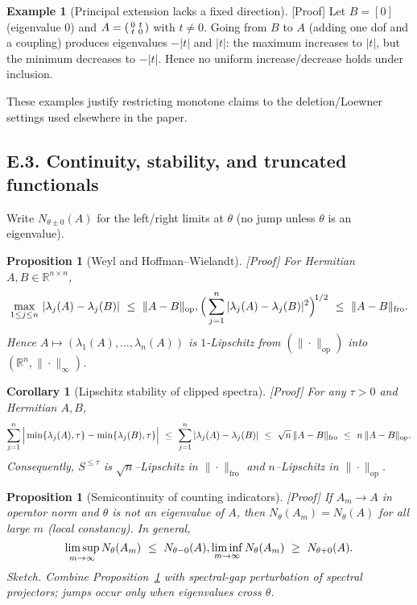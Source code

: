 \documentclass[11pt]{article}
\numberwithin{equation}{section}
\newtheorem{proposition}[theorem]{Proposition}
\newtheorem{corollary}[theorem]{Corollary}
\theoremstyle{definition}
\newtheorem{example}[theorem]{Example}
\providecommand{\n}{\unskip\space}
\begin{document}
\begin{example}[Principal extension lacks a fixed direction]\label{E:ex:principal-extend}
\textup{[Proof]}
Let \(B=[0]\) (eigenvalue \(0\)) and
\(A=\begin{psmallmatrix}0 & t\\ t & 0\end{psmallmatrix}\) with \(t\neq 0\).
Going from \(B\) to \(A\) (adding one dof and a coupling) produces eigenvalues \(-|t|\) and \(|t|\):
the maximum increases to \(|t|\), but the minimum decreases to \(-|t|\).
Hence no uniform increase/decrease holds under inclusion.
\end{example}

These examples justify restricting monotone claims to the deletion/Loewner settings used elsewhere in the paper.

\subsection*{E.3. Continuity, stability, and truncated functionals}

Write \(N_{\theta\pm 0}(A)\) for the left/right limits at \(\theta\) (no jump unless \(\theta\) is an eigenvalue).

\begin{proposition}[Weyl and Hoffman–Wielandt]\label{E:prop:weyl}
\textup{[Proof]}
For Hermitian \(A,B\in\mathbb{R}^{n\times n}\),
\[
\max_{1\le j\le n}\,|\lambda_j(A)-\lambda_j(B)|\ \le\ \|A-B\|_{\mathrm{op}},\qquad\n\Big(\sum_{j=1}^n |\lambda_j(A)-\lambda_j(B)|^2\Big)^{\!1/2}\ \le\ \|A-B\|_{\mathrm{fro}}.
\]
Hence \(A\mapsto(\lambda_1(A),\dots,\lambda_n(A))\) is \(1\)-Lipschitz from \((\|\cdot\|_{\mathrm{op}})\) into \((\mathbb{R}^n,\|\cdot\|_\infty)\).
\end{proposition}

\begin{corollary}[Lipschitz stability of clipped spectra]\label{E:cor:clip}
\textup{[Proof]}
For any \(\tau>0\) and Hermitian \(A,B\),
\[
\sum_{j=1}^n\Big|\min\{\lambda_j(A),\tau\}-\min\{\lambda_j(B),\tau\}\Big|\n\ \le\ \sum_{j=1}^n|\lambda_j(A)-\lambda_j(B)|\ \le\ \sqrt{n}\,\|A-B\|_{\mathrm{fro}}\ \le\ n\,\|A-B\|_{\mathrm{op}}.
\]
Consequently, \(S^{\le \tau}\) is \(\sqrt{n}\)–Lipschitz in \(\|\cdot\|_{\mathrm{fro}}\) and \(n\)–Lipschitz in \(\|\cdot\|_{\mathrm{op}}\).
\end{corollary}

\begin{proposition}[Semicontinuity of counting indicators]\label{E:prop:count-semi}
\textup{[Proof]}
If \(A_m\to A\) in operator norm and \(\theta\) is not an eigenvalue of \(A\), then \(N_\theta(A_m)=N_\theta(A)\) for all large \(m\) (local constancy).
In general,
\[
\limsup_{m\to\infty} N_\theta(A_m)\ \le\ N_{\theta-0}(A),\qquad\n\liminf_{m\to\infty} N_\theta(A_m)\ \ge\ N_{\theta+0}(A).
\]
\emph{Sketch.}
Combine Proposition~\ref{E:prop:weyl} with spectral-gap perturbation of spectral projectors; jumps occur only when eigenvalues cross \(\theta\).
\end{proposition}
\end{document}
